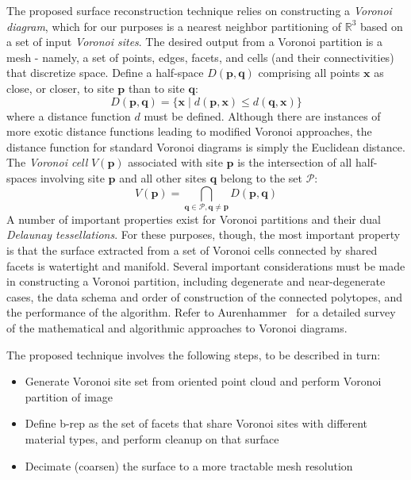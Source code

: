 The proposed surface reconstruction technique relies on constructing a \textit{Voronoi diagram}, which for our purposes is a nearest neighbor partitioning of $\mathbb{R}^3$ based on a set of input \textit{Voronoi sites}. The desired output from a Voronoi partition is a mesh - namely, a set of points, edges, facets, and cells (and their connectivities) that discretize space. Define a half-space $D(\bm{p},\bm{q})$ comprising all points $\bm{x}$ as close, or closer, to site $\bm{p}$ than to site $\bm{q}$:
\begin{equation}
D(\bm{p},\bm{q}) = \{\bm{x} \mid d(\bm{p},\bm{x}) \leq d(\bm{q},\bm{x})\}
\end{equation}
where a distance function $d$ must be defined. Although there are instances of more exotic distance functions leading to modified Voronoi approaches, the distance function for standard Voronoi diagrams is simply the Euclidean distance. The \textit{Voronoi cell} $V(\bm{p})$ associated with site $\bm{p}$ is the intersection of all half-spaces involving site $\bm{p}$ and all other sites $\bm{q}$ belong to the set $\mathcal{P}$:
\begin{equation}
V(\bm{p}) = \bigcap \limits_{\bm{q} \in \mathcal{P}, \bm{q} \neq \bm{p}} D(\bm{p},\bm{q})
\end{equation}
A number of important properties exist for Voronoi partitions and their dual \textit{Delaunay tessellations}. For these purposes, though, the most important property is that the surface extracted from a set of Voronoi cells connected by shared facets is watertight and manifold. Several important considerations must be made in constructing a Voronoi partition, including degenerate and near-degenerate cases, the data schema and order of construction of the connected polytopes, and the
performance of the algorithm. Refer to Aurenhammer~\cite{aurenhammer_1991} for a detailed survey of the mathematical and algorithmic approaches to Voronoi diagrams.

The proposed technique involves the following steps, to be described in turn:
\begin{itemize}[noitemsep]
\item Generate Voronoi site set from oriented point cloud and perform Voronoi partition of image
\item Define b-rep as the set of facets that share Voronoi sites with different material types, and perform cleanup on that surface
\item Decimate (coarsen) the surface to a more tractable mesh resolution
\end{itemize}

